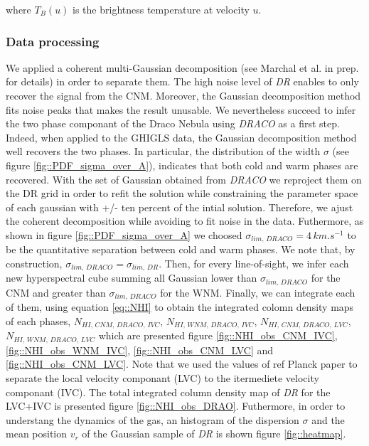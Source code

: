 \documentclass[traditabstract]{aa}
\begin{document}
\noindent
where $T_B(u)$ is the brightness temperature at velocity $u$.

\subsubsection{Data processing}
We applied a coherent multi-Gaussian decomposition (see Marchal et al. in prep. for details) in order to separate them. 
The high noise level of \textit{DR} enables to only recover the signal from the CNM. Moreover, the Gaussian decomposition 
method fits noise peaks that makes the result unusable. We nevertheless succeed to infer the two phase componant of the Draco Nebula 
using \textit{DRACO} as a first step. Indeed, when applied to the GHIGLS data, the Gaussian decomposition method well 
recovers the two phases. In particular, the distribution of the width $\sigma$ (see figure \ref{fig::PDF_sigma_over_A}), indicates 
that both cold and warm phases are recovered. With the set of Gaussian obtained from \textit{DRACO} we reproject them on the DR grid 
in order to refit the solution while constraining the parameter space of each gaussian with +/- ten percent of the intial solution. 
Therefore, we ajust the coherent decomposition while avoiding to fit noise in the data. Futhermore, as shown in figure 
\ref{fig::PDF_sigma_over_A} we choosed $\sigma_{lim, \, \textit{DRACO}} = 4 \, km.s^{-1}$ to be the quantitative separation between 
cold and warm phases. We note that, by construction, $\sigma_{lim, \, \textit{DRACO}} = \sigma_{lim, \, \textit{DR}}$. Then, for every 
line-of-sight, we infer each new hyperspectral cube summing all Gaussian lower than $\sigma_{lim, \, \textit{DRACO}}$ for the CNM 
and greater than $\sigma_{lim, \, \textit{DRACO}}$ for the WNM. Finally, we can integrate each of them, using equation \ref{eq::NHI} 
to obtain the integrated colomn density maps of each phases, $N_{HI, \, CNM, \, \textit{DRACO}, \, IVC}$, 
$N_{HI, \, WNM, \, \textit{DRACO}, \, IVC}$, $N_{HI, \, CNM, \, \textit{DRACO}, \, LVC}$, 
$N_{HI, \, WNM, \, \textit{DRACO}, \, LVC}$ which are presented figure \ref{fig::NHI_obs_CNM_IVC}, \ref{fig::NHI_obs_WNM_IVC}, 
\ref{fig::NHI_obs_CNM_LVC} and \ref{fig::NHI_obs_CNM_LVC}. Note that we used the values of \color{red} ref Planck paper \color{black}
to separate the local velocity componant (LVC) to the itermediete velocity componant (IVC). The total integrated column density map of \textit{DR} for the LVC+IVC 
is presented figure \ref{fig::NHI_obs_DRAO}. Futhermore, in order to understang the dynamics of the gas, an histogram of the 
dispersion $\sigma$ and the mean position $v_{r}$ of the Gaussian sample of \textit{DR} is shown figure \ref{fig::heatmap}.
\end{document}
